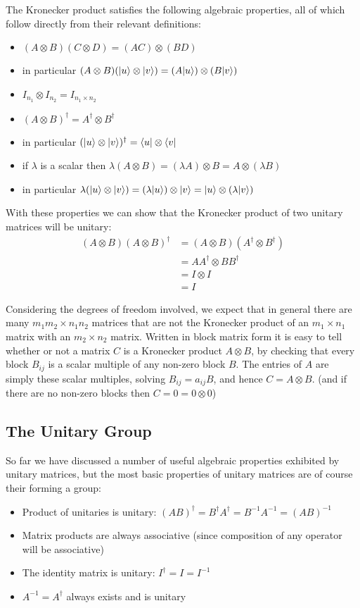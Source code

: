 The Kronecker product satisfies the following algebraic properties, all of which follow directly from their relevant definitions:
\begin{itemize}
	\item $(A\otimes B)(C \otimes D) = (AC) \otimes (BD)$
	\item in particular $(A\otimes B)(| u \rangle \otimes | v \rangle) = (A| u \rangle)\otimes (B| v \rangle)$
	\item $I_{n_1} \otimes I_{n_2} = I_{n_1\times n_2}$
	\item $(A\otimes B)^\dagger = A^\dagger \otimes B^\dagger$
	\item in particular $(| u \rangle\otimes | v \rangle)^\dagger = \langle u | \otimes \langle v |$
	\item if $\lambda$ is a scalar then $\lambda (A \otimes B) = (\lambda A) \otimes B = A \otimes (\lambda B)$
	\item in particular $\lambda (| u \rangle \otimes | v \rangle) = (\lambda | u \rangle) \otimes | v \rangle = | u \rangle \otimes (\lambda | v \rangle)$
\end{itemize}
With these properties we can show that the Kronecker product of two unitary matrices will be unitary:
\begin{align*}
	(A \otimes B)(A \otimes B)^\dagger
	&= (A \otimes B)(A^\dagger \otimes B^\dagger)
	\\&= AA^\dagger \otimes BB^\dagger
	\\&= I \otimes I
	\\&= I
\end{align*}

Considering the degrees of freedom involved, we expect that in general there are many $m_1m_2 \times n_1n_2$ matrices that are not the Kronecker product of an $m_1 \times n_1$ matrix with an $m_2 \times n_2$ matrix. Written in block matrix form it is easy to tell whether or not a matrix $C$ is a Kronecker product $A \otimes B$, by checking that every block $B_{ij}$ is a scalar multiple of any non-zero block $B$. The entries of $A$ are simply these scalar multiples, solving $B_{ij} = a_{ij}B$, and hence $C = A \otimes B$. (and if there are no non-zero blocks then $C = 0 = 0 \otimes 0$)
\subsection{The Unitary Group}
So far we have discussed a number of useful algebraic properties exhibited by unitary matrices, but the most basic properties of unitary matrices are of course their forming a group:
\begin{itemize}
	\item Product of unitaries is unitary: ${(AB)}^\dagger = B^\dagger A^\dagger = B^{-1}A^{-1} = {(AB)}^{-1}$
	\item Matrix products are always associative (since composition of any operator will be associative)
	\item The identity matrix is unitary: $I^\dagger = I = I^{-1}$
	\item $A^{-1} = A^\dagger$ always exists and is unitary
\end{itemize}

